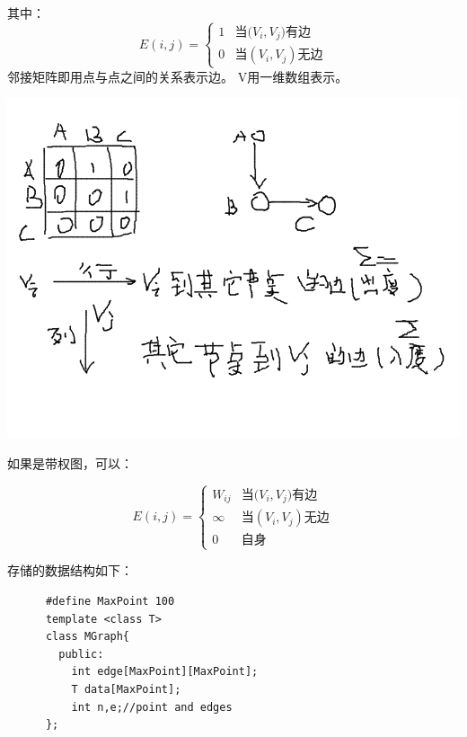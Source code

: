 \documentclass{article}
\begin{document}
		其中：
		\[
			E(i,j)=
			\left\{
				\begin{array}{ll}
					1 & \textrm{当($V_i,V_j)$有边}\\
					0 & \textrm{当$(V_i,V_j)$无边}
				\end{array}
			\right .
		\]
		邻接矩阵即用点与点之间的关系表示边。
		V用一维数组表示。

		\includegraphics[scale=0.4]{./pic/graph-02.png}


		如果是带权图，可以：

		\[
			E(i,j)=
			\left\{
				\begin{array}{ll}
					W_{ij} & \textrm{当($V_i,V_j)$有边}\\
					\infty & \textrm{当$(V_i,V_j)$无边}\\
					0	& \textrm{自身}
				\end{array}
			\right .
		\]
		
		存储的数据结构如下：
		\begin{verbatim}
      #define MaxPoint 100
      template <class T>
      class MGraph{
        public:
          int edge[MaxPoint][MaxPoint];
          T data[MaxPoint];
          int n,e;//point and edges
      };
		\end{verbatim}
\end{document}
